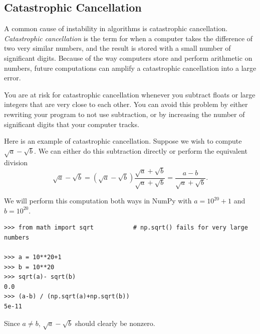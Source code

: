 \subsection*{Catastrophic Cancellation} %

A common cause of instability in algorithms is catastrophic cancellation.
\emph{Catastrophic cancellation} is the term for when a computer takes the difference of two very similar numbers, and the result is stored with a small number of significant digits.
Because of the way computers store and perform arithmetic on numbers, future computations can amplify a catastrophic cancellation into a large error.

You are at risk for catastrophic cancellation whenever you subtract floats or large integers that are very close to each other.
You can avoid this problem by either rewriting your program to not use subtraction, or by increasing the number of significant digits that your computer tracks.

Here is an example of catastrophic cancellation.
Suppose we wish to compute $\sqrt{a}-\sqrt{b}$. We can either do this subtraction directly or perform the equivalent division
\[
\sqrt{a}-\sqrt{b} = (\sqrt{a}-\sqrt{b})\frac{\sqrt{a}+\sqrt{b}}{\sqrt{a}+\sqrt{b}} = \frac{a-b}{\sqrt{a}+\sqrt{b}}.
\]

We will perform this computation both ways in NumPy with $a=10^{20}+1$ and $b=10^{20}$.
\begin{lstlisting}
>>> from math import sqrt           # np.sqrt() fails for very large numbers

>>> a = 10**20+1
>>> b = 10**20
>>> sqrt(a)- sqrt(b)
0.0
>>> (a-b) / (np.sqrt(a)+np.sqrt(b))
5e-11
\end{lstlisting}
Since $a \neq b$, $\sqrt{a}-\sqrt{b}$ should clearly be nonzero.

